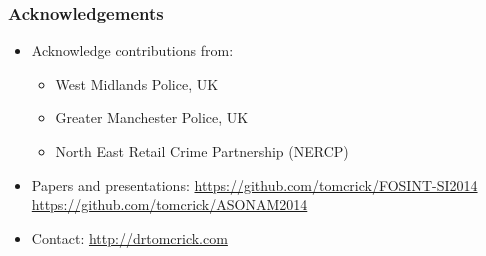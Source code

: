 \documentclass[pdftex]{beamer}
\begin{document}
\begin{frame}
\frametitle{Acknowledgements}
\begin{itemize}
\item Acknowledge contributions from:
\begin{itemize}
\item West Midlands Police, UK
\item Greater Manchester Police, UK
\item North East Retail Crime Partnership (NERCP)\newline
\end{itemize}
\item Papers and presentations:
  \url{https://github.com/tomcrick/FOSINT-SI2014}\\
\url{https://github.com/tomcrick/ASONAM2014}\newline
\item Contact: \url{http://drtomcrick.com}

\end{itemize}
\end{frame}


\end{document}
